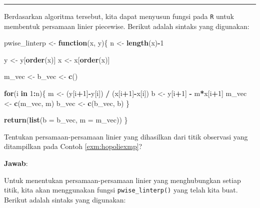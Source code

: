 \documentclass[]{book}
\newenvironment{Shaded}{\begin{snugshade}}{\end{snugshade}}
\newcommand{\ControlFlowTok}[1]{\textcolor[rgb]{0.13,0.29,0.53}{\textbf{#1}}}
\newcommand{\DataTypeTok}[1]{\textcolor[rgb]{0.13,0.29,0.53}{#1}}
\newcommand{\DecValTok}[1]{\textcolor[rgb]{0.00,0.00,0.81}{#1}}
\newcommand{\KeywordTok}[1]{\textcolor[rgb]{0.13,0.29,0.53}{\textbf{#1}}}
\newcommand{\NormalTok}[1]{#1}
\newcommand{\OperatorTok}[1]{\textcolor[rgb]{0.81,0.36,0.00}{\textbf{#1}}}
\newcommand{\StringTok}[1]{\textcolor[rgb]{0.31,0.60,0.02}{#1}}
\theoremstyle{definition}
\theoremstyle{definition}
\theoremstyle{definition}
\theoremstyle{remark}
\let\BeginKnitrBlock\begin \let\EndKnitrBlock\end
\begin{document}
\begin{center}\rule{0.5\linewidth}{\linethickness}\end{center}

Berdasarkan algoritma tersebut, kita dapat menyusun fungsi pada \texttt{R} untuk membentuk persamaan linier piecewise. Berikut adalah sintaks yang digunakan:

\begin{Shaded}
\begin{Highlighting}[]
\NormalTok{pwise_linterp <-}\StringTok{ }\ControlFlowTok{function}\NormalTok{(x, y)\{}
\NormalTok{  n <-}\StringTok{ }\KeywordTok{length}\NormalTok{(x)}\OperatorTok{-}\DecValTok{1}
  
\NormalTok{  y <-}\StringTok{ }\NormalTok{y[}\KeywordTok{order}\NormalTok{(x)]}
\NormalTok{  x <-}\StringTok{ }\NormalTok{x[}\KeywordTok{order}\NormalTok{(x)]}
  
\NormalTok{  m_vec <-}\StringTok{ }\NormalTok{b_vec <-}\StringTok{ }\KeywordTok{c}\NormalTok{()}
  
  \ControlFlowTok{for}\NormalTok{(i }\ControlFlowTok{in} \DecValTok{1}\OperatorTok{:}\NormalTok{n)\{}
\NormalTok{    m <-}\StringTok{ }\NormalTok{(y[i}\OperatorTok{+}\DecValTok{1}\NormalTok{]}\OperatorTok{-}\NormalTok{y[i]) }\OperatorTok{/}\StringTok{ }\NormalTok{(x[i}\OperatorTok{+}\DecValTok{1}\NormalTok{]}\OperatorTok{-}\NormalTok{x[i])}
\NormalTok{    b <-}\StringTok{ }\NormalTok{y[i}\OperatorTok{+}\DecValTok{1}\NormalTok{] }\OperatorTok{-}\StringTok{ }\NormalTok{m}\OperatorTok{*}\NormalTok{x[i}\OperatorTok{+}\DecValTok{1}\NormalTok{]}
\NormalTok{    m_vec <-}\StringTok{ }\KeywordTok{c}\NormalTok{(m_vec, m)}
\NormalTok{    b_vec <-}\StringTok{ }\KeywordTok{c}\NormalTok{(b_vec, b)}
\NormalTok{  \}}
  
  \KeywordTok{return}\NormalTok{(}\KeywordTok{list}\NormalTok{(}\DataTypeTok{b =}\NormalTok{ b_vec, }\DataTypeTok{m =}\NormalTok{ m_vec))}
\NormalTok{\}}
\end{Highlighting}
\end{Shaded}

\BeginKnitrBlock{example}
\protect\hypertarget{exm:pwiselinexm}{}{\label{exm:pwiselinexm} }Tentukan persamaan-persamaan linier yang dihasilkan dari titik observasi yang ditampilkan pada Contoh \ref{exm:hopoliexmp}?
\EndKnitrBlock{example}

\textbf{Jawab}:

Untuk menentukan persamaan-persamaan linier yang menghubungkan setiap titik, kita akan menggunakan fungsi \texttt{pwise\_linterp()} yang telah kita buat. Berikut adalah sintaks yang digunakan:
\end{document}
